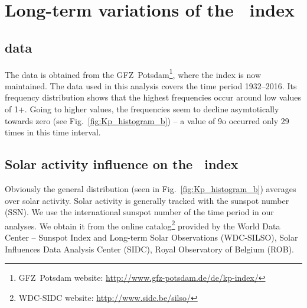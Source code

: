 \section{Long-term variations of the \Kp{}~index}
\label{sec:long_term_variations}

\subsection{\Kp{} data}
The \Kp{} data is obtained from the GFZ~Potsdam\footnote{GFZ~Potsdam website: \url{http://www.gfz-potsdam.de/de/kp-index/}}, where the index is now maintained. The data used in this analysis covers the time period 1932--2016. Its frequency distribution shows that the highest frequencies occur around low \Kp{} values of 1+. Going to higher \Kp{} values, the frequencies seem to decline asymtotically towards zero (see Fig.~\ref{fig:Kp_histogram_b}) -- a \Kp{} value of 9o occurred only 29 times in this time interval.
\begin{figure}
\end{figure}

\subsection{Solar activity influence on the \Kp{}~index}
Obviously the general \Kp{} distribution (seen in Fig.~\ref{fig:Kp_histogram_b}) averages over solar activity. Solar activity is generally tracked with the sunspot number (SSN). We use the international sunspot number of the time period \citeyear{sidc1917} in our analyses. We obtain it from the online catalog\footnote{WDC-SIDC website: \url{http://www.sidc.be/silso/}} provided by the World Data Center -- Sunspot Index and Long-term Solar Observations (WDC-SILSO), Solar Influences Data Analysis Center (SIDC), Royal Observatory of Belgium (ROB).


